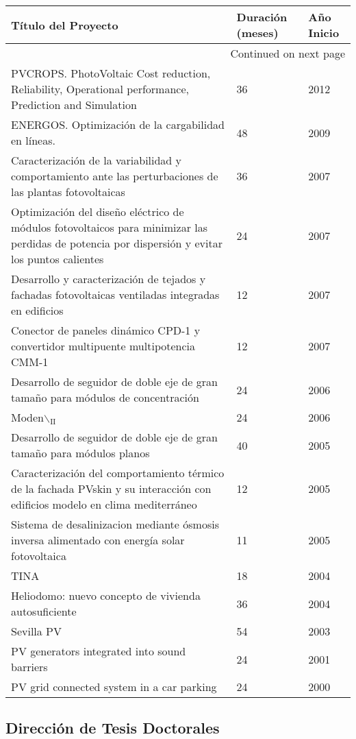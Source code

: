 \documentclass[article, a4paper]{memoir}
\begin{document}
\begin{longtable}{p{110mm}|p{17mm}|p{25mm}}
Título del Proyecto & Duración (meses) & Año Inicio\\
\hline
\endhead
\hline\multicolumn{3}{r}{Continued on next page} \\
\endfoot
\endlastfoot
PVCROPS. PhotoVoltaic Cost reduction, Reliability, Operational performance, Prediction and Simulation & 36 & 2012\\
ENERGOS. Optimización de la cargabilidad en líneas. & 48 & 2009\\
Caracterización de la variabilidad y comportamiento ante las perturbaciones de las plantas fotovoltaicas & 36 & 2007\\
Optimización del diseño eléctrico de módulos fotovoltaicos para minimizar las perdidas de potencia por dispersión y evitar los puntos calientes & 24 & 2007\\
Desarrollo y caracterización de tejados y fachadas fotovoltaicas ventiladas integradas en edificios & 12 & 2007\\
Conector de paneles dinámico CPD-1 y convertidor multipuente multipotencia CMM-1 & 12 & 2007\\
Desarrollo de seguidor de doble eje de gran tamaño para módulos de concentración & 24 & 2006\\
Moden$\backslash$$_{\text{II}}$ & 24 & 2006\\
Desarrollo de seguidor de doble eje de gran tamaño para módulos planos & 40 & 2005\\
Caracterización del comportamiento térmico de la fachada PVskin y su interacción con edificios modelo en clima mediterráneo & 12 & 2005\\
Sistema de desalinizacion mediante ósmosis inversa alimentado con energía solar fotovoltaica & 11 & 2005\\
TINA & 18 & 2004\\
Heliodomo: nuevo concepto de vivienda autosuficiente & 36 & 2004\\
Sevilla PV & 54 & 2003\\
PV generators integrated into sound barriers & 24 & 2001\\
PV grid connected system in a car parking & 24 & 2000\\
\end{longtable}


\subsection{Dirección de Tesis Doctorales}
\label{sec-4-4}
\end{document}
